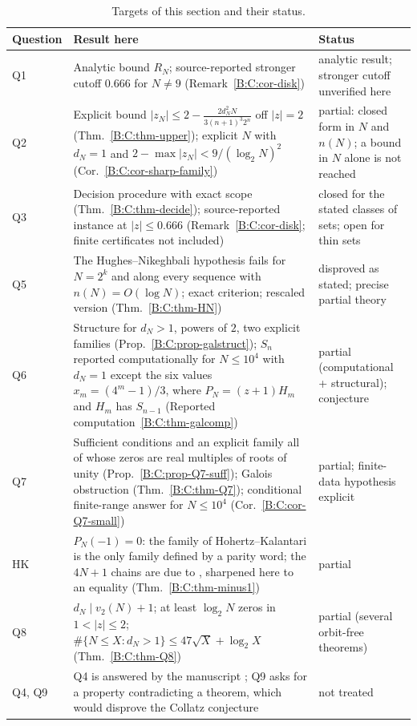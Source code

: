 \documentclass[11pt,a4paper]{article}
\theoremstyle{definition}
\theoremstyle{remark}
\numberwithin{equation}{section}
\begin{document}
\begin{table}[ht]
\centering\small
\begin{tabular}{>{\raggedright\arraybackslash}p{}>{\raggedright\arraybackslash}p{}>{\raggedright\arraybackslash}p{}}
\toprule
Question & Result here & Status\\\midrule
Q1 & Analytic bound $R_N$; source-reported stronger cutoff $0.666$ for
$N\ne9$ (Remark~\ref{B:C:cor-disk}) & analytic result; stronger cutoff unverified here\\
Q2 & Explicit bound $|z_N|\le 2-\tfrac{2d_N^2N}{3(n+1)^3 2^{n}}$ off $|z|=2$
(Thm.~\ref{B:C:thm-upper}); explicit $N$ with $d_N=1$ and
$2-\max|z_N|<9/(\log_2N)^2$ (Cor.~\ref{B:C:cor-sharp-family}) &
partial: closed form in $N$ and $n(N)$; a bound in $N$ alone is not reached\\
Q3 & Decision procedure with exact scope (Thm.~\ref{B:C:thm-decide});
source-reported instance at $|z|\le0.666$
(Remark~\ref{B:C:cor-disk}; finite certificates not included) & closed for the stated classes of sets; open for thin sets\\
Q5 & The Hughes--Nikeghbali hypothesis fails for $N=2^k$ and along every
sequence with $n(N)=O(\log N)$; exact criterion; rescaled version
(Thm.~\ref{B:C:thm-HN}) & disproved as stated; precise partial theory\\
Q6 & Structure for $d_N>1$, powers of $2$, two explicit families
(Prop.~\ref{B:C:prop-galstruct}); $S_n$ reported computationally for $N\le10^4$ with $d_N=1$ except
the six values $x_m=(4^m-1)/3$, where $P_N=(z+1)H_m$ and $H_m$ has $S_{n-1}$
(Reported computation~\ref{B:C:thm-galcomp}) & partial (computational + structural); conjecture\\
Q7 & Sufficient conditions and an explicit family all of whose zeros are real
multiples of roots of unity (Prop.~\ref{B:C:prop-Q7-suff}); Galois obstruction
(Thm.~\ref{B:C:thm-Q7}); conditional finite-range answer for $N\le10^4$
(Cor.~\ref{B:C:cor-Q7-small}) & partial; finite-data hypothesis explicit\\
HK & $P_N(-1)=0$: the family of Hohertz--Kalantari is the only family
defined by a parity word; the $4N+1$ chains are due to \cite[Lemma~11]{R025},
sharpened here to an equality (Thm.~\ref{B:C:thm-minus1}) & partial\\
Q8 & $d_N\mid v_2(N)+1$; at least $\log_2N$ zeros in $1<|z|\le2$;
$\#\{N\le X:d_N>1\}\le 47\sqrt X+\log_2X$ (Thm.~\ref{B:C:thm-Q8}) &
partial (several orbit-free theorems)\\
Q4, Q9 & Q4 is answered by the manuscript \cite[Cor.~3.2]{R021}; Q9 asks
for a property contradicting a theorem, which would disprove the Collatz
conjecture & not treated\\
\bottomrule
\end{tabular}
\caption{Targets of this section and their status.}\label{B:C:tab-status}
\end{table}
\end{document}
